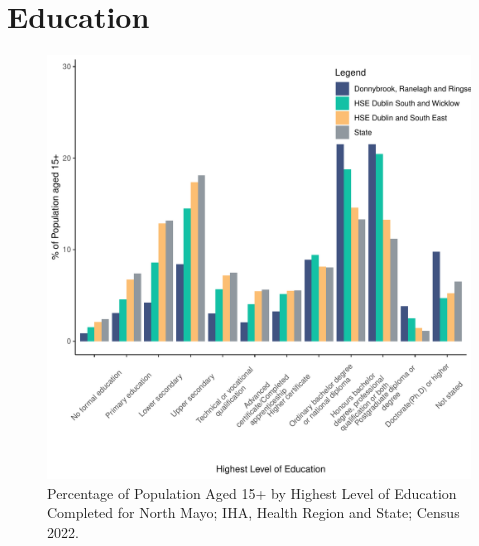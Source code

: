 \documentclass{article}
\begin{document}
\section{Education}\label{sect:Edu}
\begin{figure}[H]
	\centering
	\includegraphics[width = 120mm]{../figures/EduED.pdf}
	\caption{Percentage of Population Aged 15+ by Highest Level of Education Completed for North Mayo; IHA, Health Region and State; Census 2022.}
	\label{fig:vbnv}
	\end{figure}
\end{document}
